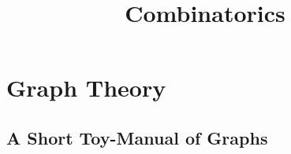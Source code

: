 

\title{Combinatorics}


\maketitle
\tableofcontents
\listoftodos

\part{Graph Theory}

\chapter{A Short Toy-Manual of Graphs}








